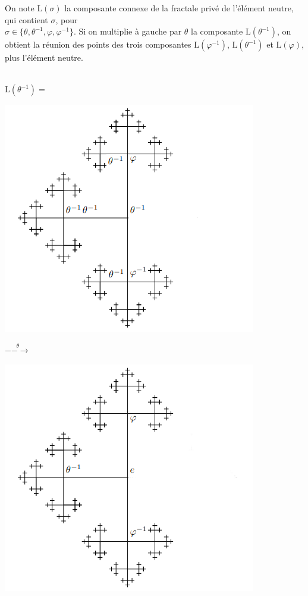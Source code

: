   On note $\mathrm{L}(\sigma)$ la composante connexe de la fractale privé de l'élément neutre, qui contient $\sigma$, pour \\$\sigma \in \{\theta, \theta^{-1}, \varphi, \varphi^{-1}\}$.
  Si on multiplie à gauche par $\theta$ la composante $\mathrm{L}(\theta^{-1})$, on obtient la réunion des points des trois composantes $\mathrm{L}(\varphi^{-1})$, $\mathrm{L}(\theta^{-1})$ et $\mathrm{L}(\varphi)$, plus l'élément neutre.\\
\\
  \begin{minipage}{0.1\textwidth}
  \centering
  $\mathrm{L}(\theta^{-1}) =$
  \end{minipage}%
  \begin{minipage}{0.25\textwidth}
  \includegraphics[scale=0.4]{./images/btt.png}
  \end{minipage}%
  \begin{minipage}{0.1\textwidth}
  \centering
  $\overset{\theta}{--\longrightarrow}$ %
  \end{minipage}%
  \begin{minipage}{0.25\textwidth}
  \includegraphics[scale=0.4]{./images/bttt.png}
  \end{minipage}%
